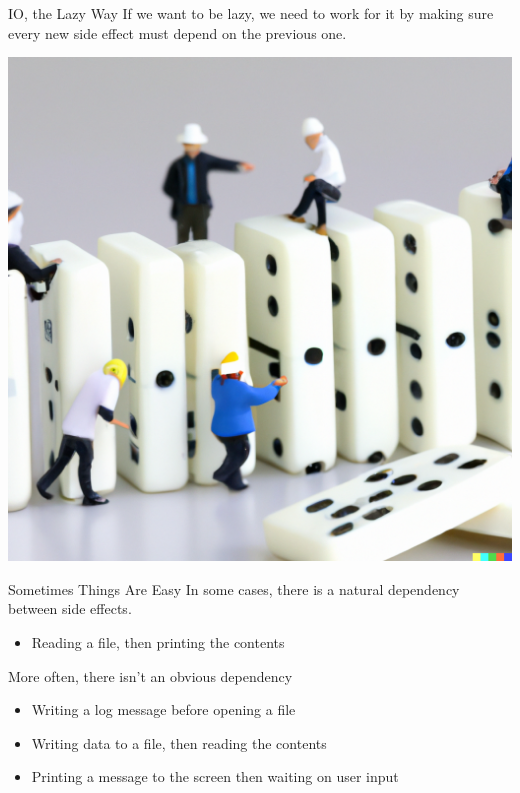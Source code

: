 \documentclass[10pt, presentation, colorlinks]{beamer}
\begin{document}
\begin{frame}[label={sec:orge81d253}]{IO, the Lazy Way}
If we want to be lazy, we need to work for it by making sure every new
side effect \alert{must depend on} the previous one.

\begin{center}
\includegraphics[height=0.6\textheight]{./img/dominos.png}
\end{center}
\end{frame}

\begin{frame}[label={sec:org05358c7}]{Sometimes Things Are Easy}
In some cases, there is a natural dependency between side effects.

\pause
\begin{itemize}
\item Reading a file, then printing the contents
\end{itemize}

\pause
More often, there isn't an obvious dependency

\pause
\begin{itemize}
\item Writing a log message before opening a file
\item Writing data to a file, then reading the contents
\item Printing a message to the screen then waiting on user input
\end{itemize}
\end{frame}
\end{document}
